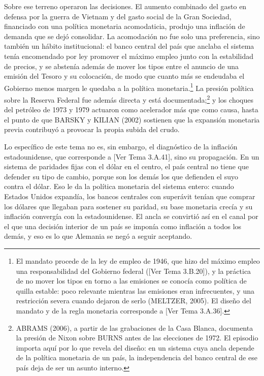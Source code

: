 \documentclass[10pt,a4paper]{article}
\newcommand{\authorfont}[1]{{\fontfamily{EBGaramond-TLF}\selectfont #1}}
\begin{document}
Sobre ese terreno operaron las decisiones. El aumento combinado del gasto en defensa por la guerra de Vietnam y del gasto social de la Gran Sociedad, financiado con una política monetaria acomodaticia, produjo una inflación de demanda que se dejó consolidar. La acomodación no fue solo una preferencia, sino también un hábito institucional: el banco central del país que anclaba el sistema tenía encomendado por ley promover el máximo empleo junto con la estabilidad de precios, y se abstenía además de mover los tipos entre el anuncio de una emisión del Tesoro y su colocación, de modo que cuanto más se endeudaba el Gobierno menos margen le quedaba a la política monetaria.\footnote{%
    El mandato procede de la ley de empleo de 1946, que hizo del máximo empleo una responsabilidad del Gobierno federal ([\authorfont{Ver Tema 3.B.20}]), y la práctica de no mover los tipos en torno a las emisiones se conocía como política de quilla estable: poco relevante mientras las emisiones eran infrecuentes, y una restricción severa cuando dejaron de serlo (MELTZER, 2005). El diseño del mandato y de la regla monetaria corresponde a [\authorfont{Ver Tema 3.A.36}].
} La presión política sobre la Reserva Federal fue además directa y está documentada;\footnote{%
    ABRAMS (2006), a partir de las grabaciones de la Casa Blanca, documenta la presión de Nixon sobre BURNS antes de las elecciones de 1972. El episodio importa aquí por lo que revela del diseño: en un sistema cuya ancla depende de la política monetaria de un país, la independencia del banco central de ese país deja de ser un asunto interno.
} y los choques del petróleo de 1973 y 1979 actuaron como acelerador más que como causa, hasta el punto de que BARSKY y KILIAN (2002) sostienen que la expansión monetaria previa contribuyó a provocar la propia subida del crudo.

Lo específico de este tema no es, sin embargo, el diagnóstico de la inflación estadounidense, que corresponde a [\authorfont{Ver Tema 3.A.41}], sino su propagación. En un sistema de paridades fijas con el dólar en el centro, el país central no tiene que defender su tipo de cambio, porque son los demás los que defienden el suyo contra el dólar. Eso le da la política monetaria del sistema entero: cuando Estados Unidos expandía, los bancos centrales con superávit tenían que comprar los dólares que llegaban para sostener su paridad, su base monetaria crecía y su inflación convergía con la estadounidense. El ancla se convirtió así en el canal por el que una decisión interior de un país se imponía como inflación a todos los demás, y eso es lo que Alemania se negó a seguir aceptando.
\end{document}
